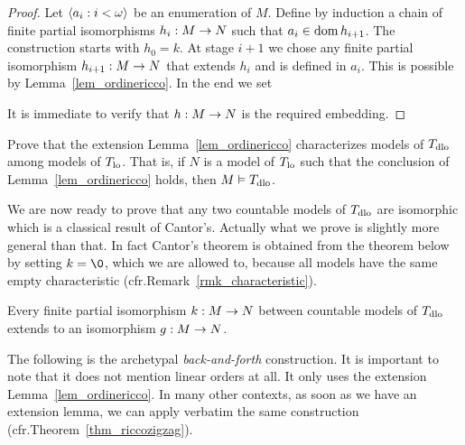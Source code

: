 \documentclass[creche.tex]{subfiles}
\begin{document}
\begin{proof}
Let $\<a_i:i<\omega\>$ be an enumeration of $M$. Define by induction a chain of finite partial isomorphisms $h_i:M\imp N$ such that $a_i\in\dom h_{i+1}$. The construction starts with $h_0=k$. At stage $i+1$ we chose any finite partial isomorphism $h_{i+1}:M\imp N$ that extends $h_i$ and is defined in $a_i$. This is possible by Lemma~\ref{lem_ordinericco}. In the end we set


It is immediate to verify that $h:M\imp N$ is the required embedding.
\end{proof}


\begin{exercise}\label{ex_ricco->dlo}
Prove that the extension Lemma~\ref{lem_ordinericco} characterizes models of $T_{\rm dlo}$ among models of $T_{\rm lo}$. That is, if $N$ is a model of $T_{\rm lo}$ such that the conclusion of Lemma~\ref{lem_ordinericco} holds, then $M\models  T_{\rm dlo}$.\QED
\end{exercise}


We are now ready to prove that any two countable models of $T_{\rm dlo}$ are isomorphic which is a classical result of Cantor's. Actually what we prove is slightly more general than that. In fact Cantor's theorem is obtained from the theorem below by setting $k=\0$, which we are allowed to, because all models have the same empty characteristic (cfr.\@ Remark~\ref{rmk_characteristic}).

\begin{theorem}\label{zigzagcantor}
Every finite partial isomorphism $k:M\imp N$ between countable models of $T_{\rm dlo}$ extends to an isomorphism $g:M\imp N$.
\end{theorem}

The following is the archetypal \emph{back-and-forth\/} construction. It is important to note that it does not mention linear orders at all. It only uses the extension Lemma~\ref{lem_ordinericco}. In many other contexts, as soon as we have an extension lemma, we can apply verbatim the same construction (cfr.\@ Theorem~\ref{thm_riccozigzag}).
\end{document}
